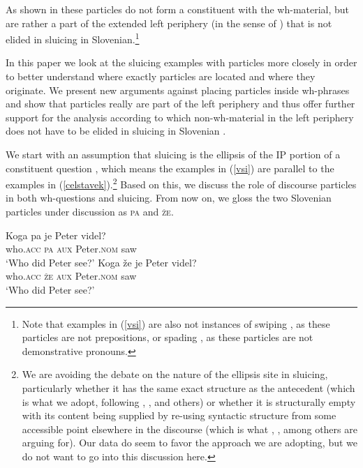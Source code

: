 \documentclass[output=paper,
modfonts,
newtxmath,
hidelinks
]{langscibook}
\begin{document}
\noindent As shown in \cite{marusicetal2015} these particles do not form a constituent with the wh-material, but are rather a part of the extended left periphery (in the sense of \citealt{rizzi1997fine}) that is not elided in sluicing in Slovenian.\footnote{Note that examples in (\ref{vsi}) are also not instances of swiping \citep{merchant2002swiping}, as these particles are not prepositions, or spading \citep{van2010syntax}, as these particles are not demonstrative pronouns.}

In this paper we look at the sluicing examples with particles more closely in order to better understand where exactly particles are located and where they originate. We present new arguments against placing particles inside wh-phrases and show that particles really are part of the left periphery and thus offer further support for the analysis according to which non-wh-material in the left periphery does not have to be elided in sluicing in Slovenian \citep{marusicetal2015}.

We start with an assumption that sluicing is the ellipsis of the IP portion of a constituent question \citep{ross1969,merchant2001,merchant2006},  which means the examples in (\ref{vsi}) are parallel to the examples in (\ref{celstavek}).\footnote{We are avoiding the debate on the nature of the ellipsis site in sluicing, particularly whether it has the same exact structure as the antecedent (which is what we adopt, following \citealt{ross1969}, \citealt{merchant2001}, and others) or whether it is structurally empty with its content being supplied by re-using syntactic structure from some accessible point elsewhere in the discourse (which is what \citealt{chungetal1995}, \citeyear{chungetal2011}, among others are arguing for). Our data do seem to favor the approach we are adopting, but we do not want to go into this discussion here.} Based on this, we discuss the role of discourse particles in both wh-questions and sluicing. From now on, we gloss the two Slovenian particles under discussion as \textsc{pa} and \textsc{že}.

\begin{exe}
\ex\label{celstavek}
\begin{xlist}
 \ex 
 \gll Koga pa je Peter 	videl?\\
 who.\textsc{acc} \textsc{pa} \textsc{aux} Peter.\textsc{nom} saw\\
 \trans `Who did Peter see?'
 \ex 
 \gll Koga že je Peter videl? \\
 who.\textsc{acc} \textsc{že}  \textsc{aux} Peter.\textsc{nom} saw\\
 \trans `Who did Peter see?'
 \end{xlist}
\end{exe}
\end{document}
